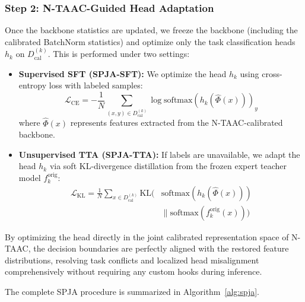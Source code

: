 \documentclass{article}
\theoremstyle{plain}
\theoremstyle{definition}
\theoremstyle{remark}
\begin{document}
\subsubsection{Step 2: N-TAAC-Guided Head Adaptation}
Once the backbone statistics are updated, we freeze the backbone (including the calibrated BatchNorm statistics) and optimize only the task classification heads $h_k$ on $D_{\text{cal}}^{(k)}$. This is performed under two settings:
\begin{itemize}
    \item \textbf{Supervised SFT (SPJA-SFT):} We optimize the head $h_k$ using cross-entropy loss with labeled samples:
    \begin{equation}
        \label{eq:sft}
        \mathcal{L}_{\text{CE}} = -\frac{1}{N}\sum_{(x, y) \in D_{\text{cal}}^{(k)}} \log \text{softmax}(h_k(\hat{\Phi}(x)))_y
    \end{equation}
    where $\hat{\Phi}(x)$ represents features extracted from the N-TAAC-calibrated backbone.
    \item \textbf{Unsupervised TTA (SPJA-TTA):} If labels are unavailable, we adapt the head $h_k$ via soft KL-divergence distillation from the frozen expert teacher model $f_k^{\text{orig}}$:
    \begin{equation}
        \label{eq:tta}
        \begin{aligned}
        \mathcal{L}_{\text{KL}} = \frac{1}{N}\sum_{x \in D_{\text{cal}}^{(k)}} \text{KL}( &\text{softmax}(h_k(\hat{\Phi}(x))) \\
        &\parallel \text{softmax}(f_k^{\text{orig}}(x)) )
        \end{aligned}
    \end{equation}
\end{itemize}
By optimizing the head directly in the joint calibrated representation space of N-TAAC, the decision boundaries are perfectly aligned with the restored feature distributions, resolving task conflicts and localized head misalignment comprehensively without requiring any custom hooks during inference.

The complete SPJA procedure is summarized in Algorithm~\ref{alg:spja}.
\end{document}
